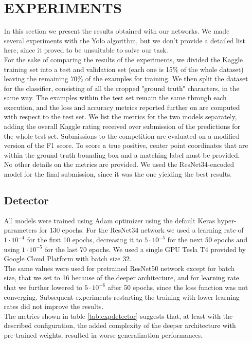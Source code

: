 \section{EXPERIMENTS}
\label{sec:experiments}
In this section we present the results obtained with our networks. We made several experiments with the Yolo algorithm, but we don't provide a detailed list here, since it proved to be unsuitable to solve our task.\\
For the sake of comparing the results of the experiments, we divided the Kaggle training set into a test and validation set (each one is 15\% of the whole dataset) leaving the remaining 70\% of the examples for training. We then split the dataset for the classifier, consisting of all the cropped "ground truth" characters, in the same way. The examples within the test set remain the same through each execution, and the loss and accuracy metrics reported further on are computed with respect to the test set. We list the metrics for the two models separately, adding the overall Kaggle rating received over submission of the predictions for the whole test set. Submissions to the competition are evaluated on a modified version of the F1 score. To score a true positive, center point coordinates that are within the ground truth bounding box and a matching label must be provided. No other details on the metrics are provided. We used the ResNet34-encoded model for the final submission, since it was the one yielding the best results.

\subsection{Detector}
\label{ssec:detectorexp}

All models were trained using Adam optimizer using the default Keras hyper-parameters for 130 epochs. For the ResNet34 network we used a learning rate of $1 \cdot 10^{-4}$ for the first 10 epochs, decreasing it to $5 \cdot 10^{-5}$ for the next 50 epochs and using $1 \cdot 10^{-5}$ for the last 70 epochs. We used a single GPU Tesla T4 provided by Google Cloud Platform with batch size 32.\\
The same values were used for pretrained ResNet50 network except for batch size, that we set to 16 because of the deeper architecture, and for learning rate that we further lowered to $5 \cdot 10^{-6}$ after 50 epochs, since the loss function was not converging. Subsequent experiments restarting the training with lower learning rates did not improve the results.\\
The metrics shown in table \ref{tab:expdetector} suggests that, at least with the described configuration, the added complexity of the deeper architecture with pre-trained weights, resulted in worse generalization performances.

